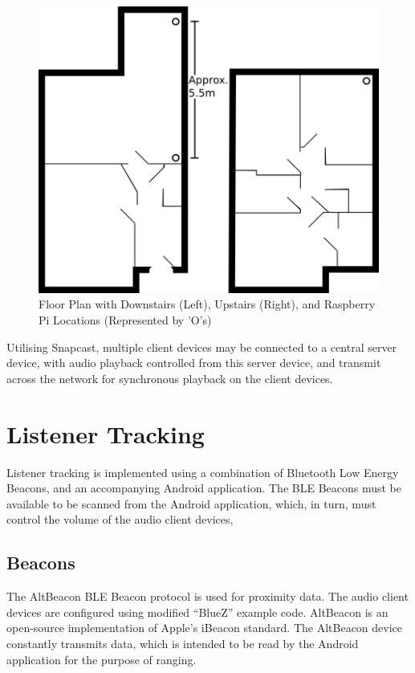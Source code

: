 \documentclass[11pt,a4paper,headinclude=false,footinclude=false]{scrreprt}
\begin{document}
\begin{figure}[H]
\includegraphics{ConceptsModellingDesign/floorplan.png}
\centering
\caption{Floor Plan with Downstairs (Left), Upstairs (Right), and Raspberry Pi
Locations (Represented by 'O's)}
\label{floorplan}
\end{figure}

Utilising Snapcast, multiple client devices may be connected to a
central server device, with audio playback controlled from this server
device, and transmit across the network for synchronous playback on the
client devices.

\section{Listener Tracking}\label{listener-tracking-1}

Listener tracking is implemented using a combination of Bluetooth Low
Energy Beacons, and an accompanying Android application. The BLE Beacons
must be available to be scanned from the Android application, which, in
turn, must control the volume of the audio client devices,

\subsection{Beacons}\label{beacons}

The AltBeacon BLE Beacon protocol is used for proximity data. The audio
client devices are configured using modified ``BlueZ'' example
code\cite{RPIAltBeacon}. AltBeacon is an open-source implementation of
Apple's iBeacon standard. The AltBeacon device constantly transmits
data, which is intended to be read by the Android application for the
purpose of ranging.
\end{document}
